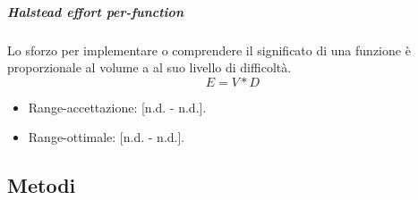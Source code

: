 			\subparagraph{Halstead effort per-function}
			Lo sforzo per implementare o comprendere il significato di una funzione è proporzionale al volume a al suo livello di difficoltà.
			 \[
			 E = V * D
			\]
			 \begin{itemize}
				\item Range-accettazione: [n.d. - n.d.].
				\item Range-ottimale: [n.d. - n.d.].
			\end{itemize}
			
			
			
			
	\subsection{Metodi}

